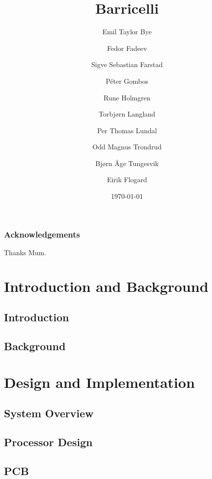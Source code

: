 \documentclass{report}
\title{Barricelli}
\date{\today}
\author{Emil Taylor Bye
     \and Fedor Fadeev
     \and Sigve Sebastian Farstad
     \and Péter Gombos
     \and Rune Holmgren
     \and Torbjørn Langland
     \and Per Thomas Lundal
     \and Odd Magnus Trondrud
     \and Bjørn Åge Tungesvik
     \and Eirik Flogard
}
\begin{document}


\maketitle

\begin{abstract}
	
\end{abstract}

\thispagestyle{empty}
\section*{Acknowledgements}
Thanks Mum.

\tableofcontents
\newpage
\setcounter{page}{1}

\part{Introduction and Background}

\chapter{Introduction}
	

\chapter{Background}
	

\part{Design and Implementation}

\chapter{System Overview}
    

\chapter{Processor Design}
	

\chapter{PCB}
	
\end{document}

